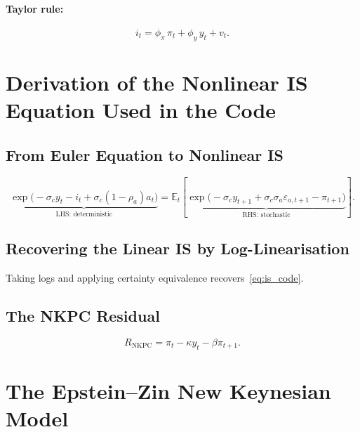 \documentclass[11pt,a4paper]{article}
\theoremstyle{definition}
\newcommand{\E}{\mathbb{E}}
\begin{document}
	\paragraph{Taylor rule:}
	\begin{equation}\label{eq:taylor_code}
		i_t = \phi_\pi \, \pi_t + \phi_y \, y_t + v_t.
	\end{equation}
	
	
	\section{Derivation of the Nonlinear IS Equation Used in the Code}
	\label{sec:is_derivation}
	
	\subsection{From Euler Equation to Nonlinear IS}
	
	\begin{equation}\label{eq:is_nonlinear}
		\boxed{\underbrace{\exp\bigl(-\sigma_c y_t - i_t + \sigma_c(1-\rho_a)a_t\bigr)}_{\text{LHS: deterministic}} = \E_t\!\left[\underbrace{\exp\bigl(-\sigma_c y_{t+1} + \sigma_c \sigma_a \varepsilon_{a,t+1} - \pi_{t+1}\bigr)}_{\text{RHS: stochastic}}\right].}
	\end{equation}
	
	\subsection{Recovering the Linear IS by Log-Linearisation}
	
	Taking logs and applying certainty equivalence recovers~\eqref{eq:is_code}.
	
	\subsection{The NKPC Residual}
	
	\begin{equation}\label{eq:nkpc_residual}
		R_{\mathrm{NKPC}} = \pi_t - \kappa y_t - \beta \pi_{t+1}.
	\end{equation}
	
	
	\section{The Epstein--Zin New Keynesian Model}
	\label{sec:ez_model}
	
\end{document}
